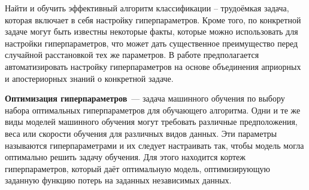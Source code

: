 \documentclass[times,specification,annotation]{itmo-student-thesis}
\begin{document}
	
	
	
	
	
	
	\tableofcontents
	
	\startprefacepage
	
	Найти и обучить эффективный алгоритм классификации – трудоёмкая задача, которая включает в себя настройку гиперпараметров. Кроме того, по конкретной задаче могут быть известны некоторые факты, которые можно использовать для настройки гиперпараметров, что может дать существенное преимущество перед случайной расстановкой тех же параметров. В работе предполагается автоматизировать настройку гиперпараметров на основе объединения априорных и апостериорных знаний о конкретной задаче.\par
	\textbf{Оптимизация гиперпараметров} — задача машинного обучения по выбору набора оптимальных гиперпараметров для обучающего алгоритма. Одни и те же виды моделей машинного обучения могут требовать различные предположения, веса или скорости обучения для различных видов данных. Эти параметры называются гиперпараметрами и их следует настраивать так, чтобы модель могла оптимально решить задачу обучения. Для этого находится кортеж гиперпараметров, который даёт оптимальную модель, оптимизирующую заданную функцию потерь на заданных независимых данных.
\end{document}
